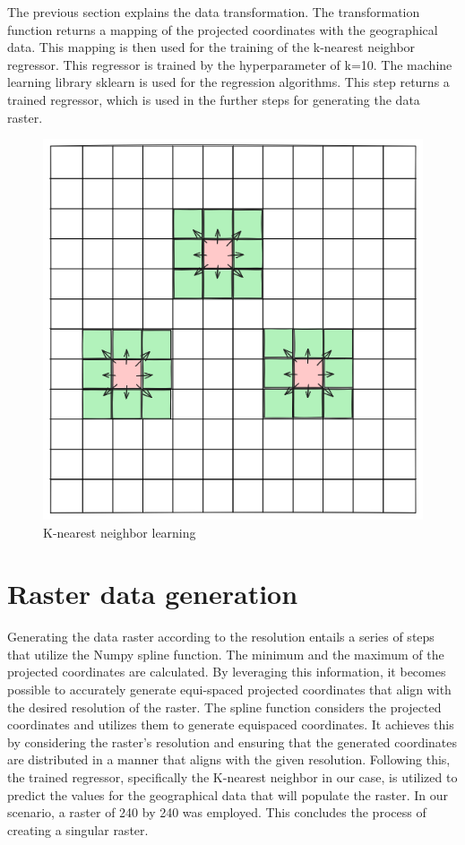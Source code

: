 The previous section explains the data transformation. The transformation function returns a mapping of the projected coordinates with the geographical data. This mapping is then used for the training of the k-nearest neighbor regressor. This regressor is trained by the hyperparameter of k=10. The machine learning library sklearn is used for the regression algorithms. This step returns a trained regressor, which is used in the further steps for generating the data raster.
\begin{figure}[h]
    \centering
    \includegraphics[width=0.5\linewidth]{figures/chapter-7/raster_interpolation.png}
    \caption{K-nearest neighbor learning}
    \label{fig:knn-learning}
\end{figure}

\section{Raster data generation}

Generating the data raster according to the resolution entails a series of steps that utilize the Numpy spline function. The minimum and the maximum of the projected coordinates are calculated. By leveraging this information, it becomes possible to accurately generate equi-spaced projected coordinates that align with the desired resolution of the raster.
The spline function considers the projected coordinates and utilizes them to generate equispaced coordinates. It achieves this by considering the raster's resolution and ensuring that the generated coordinates are distributed in a manner that aligns with the given resolution.
Following this, the trained regressor, specifically the K-nearest neighbor in our case, is utilized to predict the values for the geographical data that will populate the raster. In our scenario, a raster of 240 by 240 was employed. This concludes the process of creating a singular raster.

